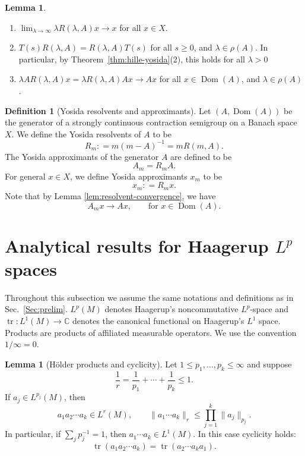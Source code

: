 \documentclass[11pt,a4paper]{article}
\theoremstyle{plain}
\numberwithin{theorem}{section}
\theoremstyle{definition}
\newtheorem{definition}[theorem]{Definition}
\newtheorem{lemma}[theorem]{Lemma}
\newcommand{\?}{\overset{?}{=}}
\newcommand{\defeq}{\mathrel{\mathop:}=}
\newcommand{\I}{\infty}
\renewcommand{\l}{\lambda}	%
\DeclareMathOperator{\Dom}{Dom}
\begin{document}
\begin{appendix}
\begin{lemma}
\begin{enumerate}
    \item $\lim_{\lambda\to\I}\l R(\l,A)x\to x $ for all $x\in X$.
    \item $T(s)R(\lambda,A)=R(\lambda,A)T(s)$ for all $s\geq0$, and $\lambda\in \rho(A)$. In particular, by Theorem~\ref{thm:hille-yosida}(2), this holds for all $\lambda>0$
    \item $\l AR(\l,A)x=\l R(\l,A)Ax\to Ax $ for all $x\in \Dom(A)$, and $\lambda\in \rho(A)$.
\end{enumerate}
\end{lemma}
\begin{definition}[Yosida resolvents and approximants]
Let $(A,\Dom(A))$ be the generator of a strongly continuous contraction semigroup on a Banach space $X$. We define the Yosida resolvents of $A$ to be
\begin{equation}
    R_m \defeq m(m-A)^{-1} = mR(m,A).
\end{equation}
The Yosida approximants of the generator $A$ are defined to be 
\begin{equation}
    A_m = R_mA.
\end{equation}
For general $x\in X$, we define Yosida approximants $x_m$ to be
\begin{equation}
    x_m \defeq R_mx.
\end{equation}
Note that by Lemma \ref{lem:resolvent-convergence}, we have
\begin{equation}
    A_mx\to Ax,\qquad\text{for }x\in \Dom(A).
\end{equation}
\end{definition}


\section{Analytical results for Haagerup \texorpdfstring{$L^p$}{Lp} spaces}\label{Sec:app-haagerupLp}

Throughout this subsection we assume the same notations and definitions as in Sec.~\ref{Sec:prelim}. \(L^p(M)\) denotes Haagerup's noncommutative
\(L^p\)-space and \(\operatorname{tr}:L^1(M)\to\mathbb C\) denotes the canonical functional on Haagerup's $L^1$ space.  Products are products of affiliated measurable operators.
We use the convention \(1/\infty=0\).

\begin{lemma}[H\"older products and cyclicity]\label{lem:holder-products-trace-cyclicity}
Let \(1\le p_1,\ldots,p_k\le\infty\) and suppose
\[
        \frac1r=\frac1{p_1}+\cdots+\frac1{p_k}\le1 .
\]
If \(a_j\in L^{p_j}(M)\), then
\[
        a_1a_2\cdots a_k\in L^r(M),
        \qquad
        \|a_1\cdots a_k\|_r
        \le
        \prod_{j=1}^k\|a_j\|_{p_j}.
\]
In particular, if \(\sum_j p_j^{-1}=1\), then \(a_1\cdots a_k\in L^1(M)\).
In this case cyclicity holds:
\[
        \operatorname{tr}(a_1a_2\cdots a_k)
        =
        \operatorname{tr}(a_2\cdots a_ka_1).
\]
\end{lemma}


\end{appendix}
\end{document}
